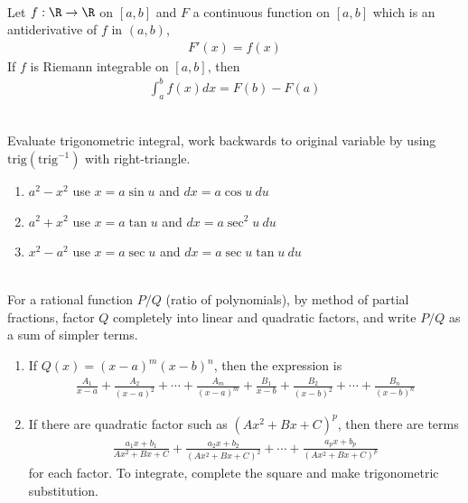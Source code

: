 \begin{theorem} \\
Let $f: \R \rightarrow \R$ on $[a,b]$ and $F$ a continuous function on $[a,b]$ which is an antiderivative of $f$ in $(a,b)$,
\begin{align}
F'(x) = f(x) \nonumber
\end{align}
If $f$ is Riemann integrable on $[a,b]$, then
\begin{align}
\int_{a}^b f(x) dx = F(b) - F(a) \nonumber
\end{align}
\end{theorem}

\begin{remark} \\
Evaluate trigonometric integral, work backwards to original variable by using $\text{trig}(\text{trig}^{-1})$ with right-triangle.
\begin{enumerate}[label=\roman*.]
\setlength{\itemsep}{0pt}
\item $a^2 - x^2$ use $x = a \sin u$ and $dx = a \cos u \ du$
\item $a^2 + x^2$ use $x = a \tan u$ and $dx = a \sec^2 u \ du$
\item $x^2 - a^2$ use $x = a \sec u$ and $dx = a \sec u \tan u \ du$
\end{enumerate}
\end{remark}

\begin{remark} \\
For a rational function $P/Q$ (ratio of polynomials), by method of partial fractions, factor $Q$ completely into linear and quadratic factors, and write $P/Q$ as a sum of simpler terms.
\begin{enumerate}[label=\roman*.]
\setlength{\itemsep}{0pt}
\item If $Q(x) = (x-a)^m (x-b)^n$, then the expression is
\begin{align}
\frac{A_1}{x-a} + \frac{A_2}{(x-a)^2} + \cdots + \frac{A_m}{(x-a)^m} + \frac{B_1}{x-b} + \frac{B_2}{(x-b)^2} + \cdots + \frac{B_n}{(x-b)^n} \nonumber
\end{align}
\item If there are quadratic factor such as $(Ax^2 + Bx + C)^p$, then there are terms
\begin{align}
\frac{a_1 x + b_1}{Ax^2 + Bx + C} + \frac{a_2 x + b_2}{(Ax^2 + Bx + C)^2} + \cdots + \frac{a_p x + b_p}{(Ax^2 + Bx + C)^p} \nonumber
\end{align}
for each factor. To integrate, complete the square and make trigonometric substitution.
\end{enumerate}
\end{remark}

